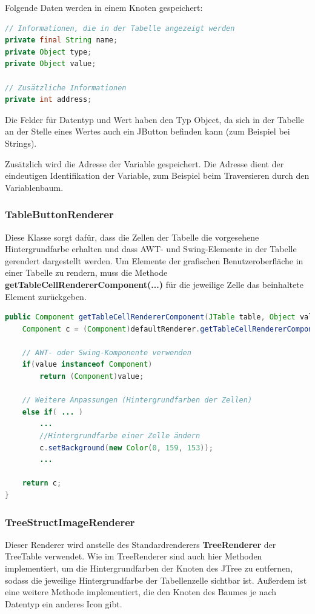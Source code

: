 Folgende Daten werden in einem Knoten gespeichert:
\begin{lstlisting}[language=JAVA]
// Informationen, die in der Tabelle angezeigt werden
private final String name;
private Object type;
private Object value;

// Zusätzliche Informationen
private int address;
\end{lstlisting}
Die Felder für Datentyp und Wert haben den Typ Object, da sich in der Tabelle an der Stelle eines Wertes auch ein JButton befinden kann (zum Beispiel bei Strings).

Zusätzlich wird die Adresse der Variable gespeichert. Die Adresse dient der eindeutigen Identifikation der Variable, zum Beispiel beim Traversieren durch den Variablenbaum.

\subsubsection*{TableButtonRenderer}
Diese Klasse sorgt dafür, dass die Zellen der Tabelle die vorgesehene Hintergrundfarbe erhalten und dass AWT- und Swing-Elemente in der Tabelle gerendert dargestellt werden. Um Elemente der grafischen Benutzeroberfläche in einer Tabelle zu rendern, muss die Methode \textbf{getTableCellRendererComponent(...)} für die jeweilige Zelle das beinhaltete Element zurückgeben.
\begin{lstlisting}[language=JAVA]
public Component getTableCellRendererComponent(JTable table, Object value, boolean isSelected, boolean hasFocus, int row, int column) {
	Component c = (Component)defaultRenderer.getTableCellRendererComponent(table, value, isSelected, hasFocus, row, column);
	
	// AWT- oder Swing-Komponente verwenden
	if(value instanceof Component)
		return (Component)value;
	
	// Weitere Anpassungen (Hintergrundfarben der Zellen)
	else if( ... )
		...
		//Hintergrundfarbe einer Zelle ändern
		c.setBackground(new Color(0, 159, 153));
		...
	
	return c;
}
\end{lstlisting}

\subsubsection*{TreeStructImageRenderer}
Dieser Renderer wird anstelle des Standardrenderers \textbf{TreeRenderer} der TreeTable verwendet. Wie im TreeRenderer sind auch hier Methoden implementiert, um die Hintergrundfarben der Knoten des JTree zu entfernen, sodass die jeweilige Hintergrundfarbe der Tabellenzelle sichtbar ist. Außerdem ist eine weitere Methode implementiert, die den Knoten des Baumes je nach Datentyp ein anderes Icon gibt.

